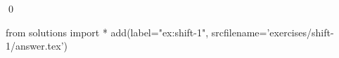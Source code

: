 
\begin{ex} 
  \label{ex:shift-1}
  
  \qed
\end{ex} 
\begin{python0}
from solutions import *
add(label="ex:shift-1",
    srcfilename='exercises/shift-1/answer.tex') 
\end{python0}
